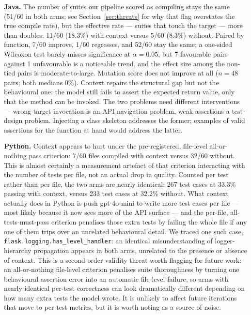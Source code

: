 \textbf{Java.} The number of suites our pipeline scored as compiling stays the same (51/60
in both arms; see Section~\ref{sec:threats} for why that flag overstates the true compile
rate), but the effective rate --- suites that touch the target --- more than doubles:
11/60 (18.3\%) with context versus 5/60 (8.3\%) without. Paired by function, 7/60 improve, 1/60 regresses, and 52/60
stay the same; a one-sided Wilcoxon test barely misses significance at $\alpha=0.05$, but
7 favourable pairs against 1 unfavourable is a noticeable trend, and the effect size among
the non-tied pairs is moderate-to-large. Mutation score does not improve at all ($n=48$
pairs; both medians 0\%). Context repairs the structural gap but not the behavioural one:
the model still fails to assert the expected return value, only that the method can be
invoked. The two problems need different interventions --- wrong-target invocation is an
API-navigation problem, weak assertions a test-design problem. Injecting a class skeleton
addresses the former; examples of valid assertions for the function at hand would address
the latter.

\textbf{Python.} Context appears to hurt under the pre-registered, file-level
all-or-nothing pass criterion: 7/60 files compiled with context versus 32/60 without. This
is almost certainly a measurement artefact of that criterion interacting with the number
of tests per file, not an actual drop in quality. Counted per test rather than per file,
the two arms are nearly identical: 267 test cases at 33.3\% passing with context, versus
233 test cases at 32.2\% without. What context actually does in Python is push gpt-4o-mini
to write more test cases per file --- most likely because it now sees more of the API
surface --- and the per-file, all-tests-must-pass criterion penalises those extra tests by
failing the whole file if any one of them trips over an unrelated behavioural detail. We
traced one such case, \texttt{flask.logging.has\_level\_handler}: an identical
misunderstanding of logger-hierarchy propagation appears in both arms, unrelated to the
presence or absence of context. This is a second-order validity threat worth flagging for
future work: an all-or-nothing file-level criterion penalises suite thoroughness by
turning one behavioural assertion error into an automatic file-level failure, so arms with
nearly identical per-test correctness can look dramatically different depending on how many
extra tests the model wrote. It is unlikely to affect future iterations that move to
per-test metrics, but it is worth noting as a source of noise.

